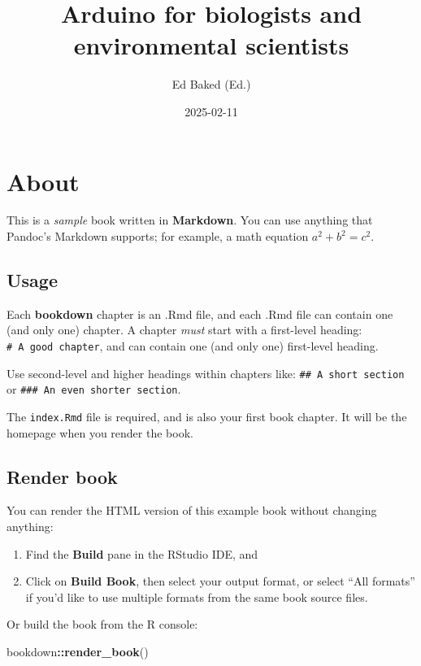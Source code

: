 \documentclass[
]{book}
\title{Arduino for biologists and environmental scientists}
\author{Ed Baked (Ed.)}
\date{2025-02-11}
\newenvironment{Shaded}{\begin{snugshade}}{\end{snugshade}}
\newcommand{\FunctionTok}[1]{\textcolor[rgb]{0.13,0.29,0.53}{\textbf{#1}}}
\newcommand{\NormalTok}[1]{#1}
\newcommand{\SpecialCharTok}[1]{\textcolor[rgb]{0.81,0.36,0.00}{\textbf{#1}}}
\begin{document}
\maketitle

{
\setcounter{tocdepth}{1}
\tableofcontents
}
\chapter{About}\label{about}

This is a \emph{sample} book written in \textbf{Markdown}. You can use anything that Pandoc's Markdown supports; for example, a math equation \(a^2 + b^2 = c^2\).

\section{Usage}\label{usage}

Each \textbf{bookdown} chapter is an .Rmd file, and each .Rmd file can contain one (and only one) chapter. A chapter \emph{must} start with a first-level heading: \texttt{\#\ A\ good\ chapter}, and can contain one (and only one) first-level heading.

Use second-level and higher headings within chapters like: \texttt{\#\#\ A\ short\ section} or \texttt{\#\#\#\ An\ even\ shorter\ section}.

The \texttt{index.Rmd} file is required, and is also your first book chapter. It will be the homepage when you render the book.

\section{Render book}\label{render-book}

You can render the HTML version of this example book without changing anything:

\begin{enumerate}
\def\labelenumi{\arabic{enumi}.}
\item
  Find the \textbf{Build} pane in the RStudio IDE, and
\item
  Click on \textbf{Build Book}, then select your output format, or select ``All formats'' if you'd like to use multiple formats from the same book source files.
\end{enumerate}

Or build the book from the R console:

\begin{Shaded}
\begin{Highlighting}[]
\NormalTok{bookdown}\SpecialCharTok{::}\FunctionTok{render\_book}\NormalTok{()}
\end{Highlighting}
\end{Shaded}
\end{document}
